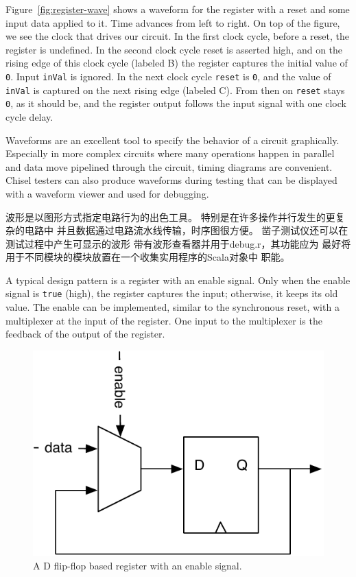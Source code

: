 \documentclass[%
    10pt,
    headinclude, footexclude,
    openright, %
    notitlepage,
    cleardoubleempty,
    headsepline,
    pointlessnumbers,
    bibtotoc, idxtotoc,
    ]{scrbook}
\newcommand{\code}[1]{{\small{\texttt{#1}}}}
\newcommand{\scale}{0.7}
\begin{document}
Figure~\ref{fig:register-wave} shows a waveform for the register with a reset
and some input data applied to it.
Time advances from left to right. On top of the figure, we see the clock that drives our circuit.
In the first clock cycle, before a reset, the register is undefined. In the second clock cycle reset
is asserted high, and on the rising edge of this clock cycle (labeled B) the register
captures the initial value of \code{0}. Input \code{inVal} is ignored. In the next clock cycle
\code{reset} is \code{0}, and the value of \code{inVal} is captured on the next rising
edge (labeled C). From then on \code{reset} stays \code{0}, as it should be, and the
register output follows the input signal with one clock cycle delay.

Waveforms are an excellent tool to specify the behavior of a circuit graphically.
Especially in more complex circuits where many operations happen in parallel
and data move pipelined through the circuit, timing diagrams are convenient.
Chisel testers can also produce waveforms during testing that can be displayed
with a waveform viewer and used for debugging.


波形是以图形方式指定电路行为的出色工具。
特别是在许多操作并行发生的更复杂的电路中
并且数据通过电路流水线传输，时序图很方便。
凿子测试仪还可以在测试过程中产生可显示的波形
带有波形查看器并用于debug.r，其功能应为
最好将用于不同模块的模块放置在一个收集实用程序的Scala对象中
职能。

A typical design pattern is a register with an enable signal. Only when the enable signal
is \code{true} (high), the register captures the input; otherwise, it keeps its old value.
The enable can be implemented, similar to the synchronous reset, with
a multiplexer at the input of the register. One input to the multiplexer is the feedback of the
output of the register.

\begin{figure}
  \centering
  \includegraphics[scale=\scale]{figures/register-enable}
  \caption{A D flip-flop based register with an enable signal.}
  \label{fig:register-enable}
\end{figure}
\end{document}
